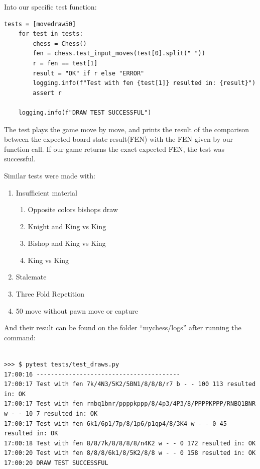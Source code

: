 \documentclass[10pt]{article}
\begin{document}
Into our specific test function:

\begin{lstlisting}
tests = [movedraw50]
    for test in tests:
        chess = Chess()
        fen = chess.test_input_moves(test[0].split(" "))
        r = fen == test[1]
        result = "OK" if r else "ERROR"
        logging.info(f"Test with fen {test[1]} resulted in: {result}")
        assert r

    logging.info(f"DRAW TEST SUCCESSFUL")

\end{lstlisting}

The test plays the game move by move, and prints the result of the comparison between the expected board state
result(FEN) with the FEN given by our function call. If our game returns the
exact expected FEN, the test was successful.

Similar tests were made with:
\begin{enumerate}[label=\arabic*)]
\item Insufficient material
    \begin{enumerate}[label=\arabic{enumii}.\arabic*)]
    \item Opposite colors bishops draw
    \item Knight and King vs King
    \item Bishop and King vs King
    \item King vs King
    \end{enumerate}
    
    \item Stalemate 
    \item Three Fold Repetition
    \item 50 move without pawn move or capture
\end{enumerate}

And their result can be found on the folder ``mychess/logs'' after running the
command:
\begin{lstlisting}

>>> $ pytest tests/test_draws.py
17:00:16 ----------------------------------------
17:00:17 Test with fen 7k/4N3/5K2/5BN1/8/8/8/r7 b - - 100 113 resulted in: OK
17:00:17 Test with fen rnbq1bnr/ppppkppp/8/4p3/4P3/8/PPPPKPPP/RNBQ1BNR w - - 10 7 resulted in: OK
17:00:17 Test with fen 6k1/6p1/7p/8/1p6/p1qp4/8/3K4 w - - 0 45 resulted in: OK
17:00:18 Test with fen 8/8/7k/8/8/8/8/n4K2 w - - 0 172 resulted in: OK
17:00:20 Test with fen 8/8/8/6k1/8/5K2/8/8 w - - 0 158 resulted in: OK
17:00:20 DRAW TEST SUCCESSFUL

\end{lstlisting}
\end{document}
